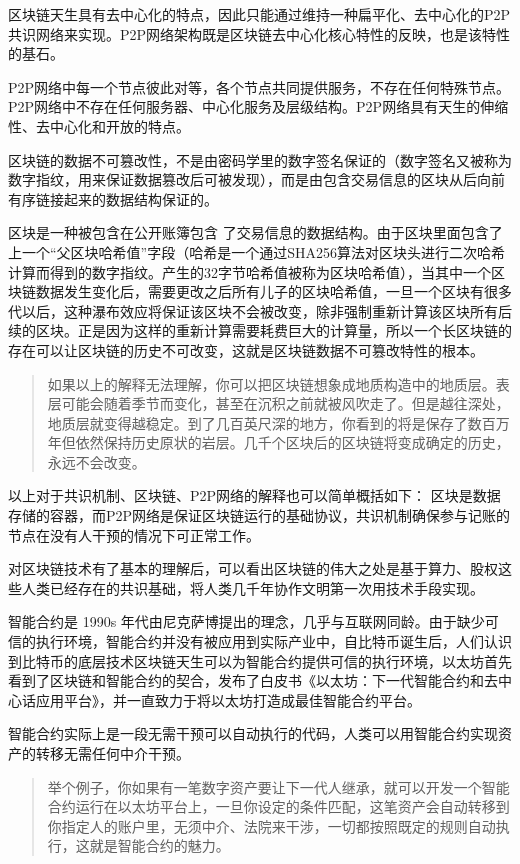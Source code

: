 \documentclass[]{ctexbook}
\begin{document}
区块链天生具有去中心化的特点，因此只能通过维持一种扁平化、去中心化的P2P共识网络来实现。P2P网络架构既是区块链去中心化核心特性的反映，也是该特性的基石。

P2P网络中每一个节点彼此对等，各个节点共同提供服务，不存在任何特殊节点。P2P网络中不存在任何服务器、中心化服务及层级结构。P2P网络具有天生的伸缩性、去中心化和开放的特点。

区块链的数据不可篡改性，不是由密码学里的数字签名保证的（数字签名又被称为数字指纹，用来保证数据篡改后可被发现），而是由包含交易信息的区块从后向前有序链接起来的数据结构保证的。

区块是一种被包含在公开账簿包含 了交易信息的数据结构。由于区块里面包含了上一个``父区块哈希值''字段（哈希是一个通过SHA256算法对区块头进行二次哈希计算而得到的数字指纹。产生的32字节哈希值被称为区块哈希值），当其中一个区块链数据发生变化后，需要更改之后所有儿子的区块哈希值，一旦一个区块有很多代以后，这种瀑布效应将保证该区块不会被改变，除非强制重新计算该区块所有后续的区块。正是因为这样的重新计算需要耗费巨大的计算量，所以一个长区块链的存在可以让区块链的历史不可改变，这就是区块链数据不可篡改特性的根本。

\begin{quote}
如果以上的解释无法理解，你可以把区块链想象成地质构造中的地质层。表层可能会随着季节而变化，甚至在沉积之前就被风吹走了。但是越往深处，地质层就变得越稳定。到了几百英尺深的地方，你看到的将是保存了数百万年但依然保持历史原状的岩层。几千个区块后的区块链将变成确定的历史，永远不会改变。
\end{quote}

以上对于共识机制、区块链、P2P网络的解释也可以简单概括如下：
区块是数据存储的容器，而P2P网络是保证区块链运行的基础协议，共识机制确保参与记账的节点在没有人干预的情况下可正常工作。

对区块链技术有了基本的理解后，可以看出区块链的伟大之处是基于算力、股权这些人类已经存在的共识基础，将人类几千年协作文明第一次用技术手段实现。

智能合约是 1990s 年代由尼克萨博提出的理念，几乎与互联网同龄。由于缺少可信的执行环境，智能合约并没有被应用到实际产业中，自比特币诞生后，人们认识到比特币的底层技术区块链天生可以为智能合约提供可信的执行环境，以太坊首先看到了区块链和智能合约的契合，发布了白皮书《以太坊：下一代智能合约和去中心话应用平台》，并一直致力于将以太坊打造成最佳智能合约平台。

智能合约实际上是一段无需干预可以自动执行的代码，人类可以用智能合约实现资产的转移无需任何中介干预。

\begin{quote}
举个例子，你如果有一笔数字资产要让下一代人继承，就可以开发一个智能合约运行在以太坊平台上，一旦你设定的条件匹配，这笔资产会自动转移到你指定人的账户里，无须中介、法院来干涉，一切都按照既定的规则自动执行，这就是智能合约的魅力。
\end{quote}
\end{document}
